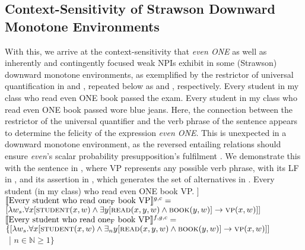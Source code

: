 \subsection{Context-Sensitivity of Strawson Downward Monotone Environments}
With this, we arrive at the context-sensitivity that \textit{even ONE} as well as inherently and contingently focused weak NPIs exhibit in some (Strawson) downward monotone environments, as exemplified by the restrictor of universal quantification in  and , repeated below as  and , respectively.
\pex[nopreamble=true]%
\a{} Every student in my class who read even \MakeUppercase{one} book passed the exam.
\a{}\ljudge{\#}Every student in my class who read even \MakeUppercase{one} book passed wore blue jeans.
\xe
Here, the connection between the restrictor of the universal quantifier and the verb phrase of the sentence appears to determine the felicity of the expression \textit{even \MakeUppercase{one}}. This is unexpected in a downward monotone environment, as the reversed entailing relations should ensure \textit{even}'s scalar probability presupposition's fulfilment \parencite{Crnic2014-dogma,Crnic2014-nm}. We demonstrate this with the sentence in , where VP represents any possible verb phrase, with its LF in , and its assertion in , which generates the set of alternatives in .
\pex[nopreamble=true]\label{ex:even-sdm-demo}%
\a{} Every student (in my class) who read even \MakeUppercase{one} book VP.
\a[]\phantomsection [even\textsubscript{C} [every student who read one\textsubscript{F} book VP]]
\a{} $\intension[g,c]{Every student who read one\textsubscript{F} book VP}=$\\\emptyfill$[\lambda{w_s}.\forall{x}[\predicate{student}(x,w)\land\exists{y}[\predicate{read}(x,y,w)\land\predicate{book}(y,w)]\rightarrow\predicate{vp}(x,w)]]$
\a{} $\intension[f,g,c]{Every student who read one\textsubscript{F} book VP}=$\\$\{[\lambda{w_s}.\forall{x}[\predicate{student}(x,w)\land\exists_n{y}[\predicate{read}(x,y,w)\land\predicate{book}(y,w)]\rightarrow\predicate{vp}(x,w)]]$\\\emptyfill~| $n\in\mathbb{N}\geqslant1\}$
